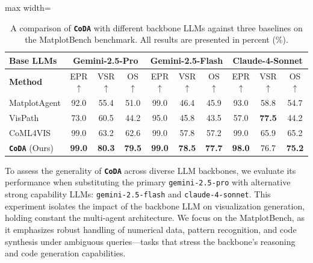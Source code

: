 \documentclass[11pt, a4paper, logo, copyright]{googlecloud}
\newcommand{\methodname}{\textbf{\texttt{\textcolor{StarIndigo}{C}\textcolor{StarIndigo}{o}\textcolor{StarCoral}{D}\textcolor{StarTeal}{A}}}}
\newcommand{\io}[1]{\setlength{\fboxsep}{1pt}\colorbox{gray!10}{\texttt{#1}}}
\newcommand{\best}[1]{\setlength{\fboxsep}{2.5pt}\colorbox{StarTeal!18}{\textbf{#1}}}
\begin{document}
\begin{table}[t]
\caption{A comparison of \methodname{} with different backbone LLMs against three baselines on the MatplotBench benchmark. All results are presented in percent (\%).}
\centering
\footnotesize 
\setlength{\tabcolsep}{6.5pt} 
\begin{adjustbox}{max width=\linewidth}
\begin{tabular}{@{}l|ccc |ccc |ccc@{}}
\toprule
\textbf{Base LLMs}& \multicolumn{3}{c|}{\textbf{Gemini-2.5-Pro}} & \multicolumn{3}{c|}{\textbf{Gemini-2.5-Flash}} & \multicolumn{3}{c}{\textbf{Claude-4-Sonnet}} \\
\midrule
\textbf{Method} & EPR $\uparrow$ & VSR $\uparrow$ & OS $\uparrow$ & EPR $\uparrow$ & VSR $\uparrow$ & OS $\uparrow$ & EPR $\uparrow$ & VSR $\uparrow$ & OS $\uparrow$ \\
\midrule
MatplotAgent & 92.0 & 55.4 & 51.0 & 99.0 & 46.4 & 45.9 & 93.0 & 58.8 & 54.7 \\
VisPath & 73.0 & 60.5 & 44.2 & 95.0 & 45.8 & 43.5 & 57.0 & \best{77.5} & 44.2 \\
CoML4VIS & 99.0 & 63.2 & 62.6 & 99.0 & 57.8 & 57.2 & 99.0 & 65.9 & 65.2 \\ \midrule
\methodname{} (Ours) & \best{99.0} & \best{80.3} & \best{79.5} & \best{99.0} & \best{78.5} & \best{77.7} & \best{98.0} & 76.7 & \best{75.2} \\
\bottomrule
\end{tabular}
\end{adjustbox}
\label{tab:backbone-comparison}
\end{table}

To assess the generality of \methodname{} across diverse LLM backbones, we evaluate its performance when substituting the primary \io{gemini-2.5-pro} with alternative strong capability LLMs: \io{gemini-2.5-flash} and \io{claude-4-sonnet}. 
This experiment isolates the impact of the backbone LLM on visualization generation, holding constant the multi-agent architecture. We focus on the MatplotBench, as it emphasizes robust handling of numerical data, pattern recognition, and code synthesis under ambiguous queries—tasks that stress the backbone's reasoning and code generation capabilities.
\end{document}
